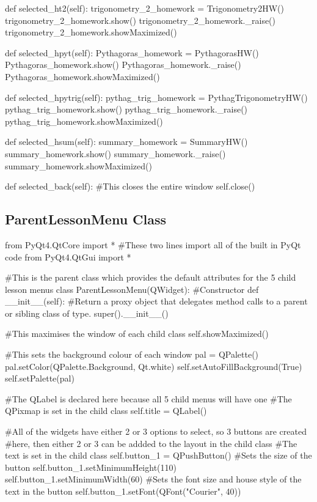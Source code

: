 \begin{landscape}
\begin{python}
    def selected_ht2(self):
        trigonometry_2_homework = Trigonometry2HW()
        trigonometry_2_homework.show()
        trigonometry_2_homework._raise()
        trigonometry_2_homework.showMaximized()

    def selected_hpyt(self):
        Pythagoras_homework = PythagorasHW()
        Pythagoras_homework.show()
        Pythagoras_homework._raise()
        Pythagoras_homework.showMaximized()

    def selected_hpytrig(self):
        pythag_trig_homework = PythagTrigonometryHW()
        pythag_trig_homework.show()
        pythag_trig_homework._raise()
        pythag_trig_homework.showMaximized()

    def selected_hsum(self):
        summary_homework = SummaryHW()
        summary_homework.show()
        summary_homework._raise()
        summary_homework.showMaximized()

    def selected_back(self):
        #This closes the entire window
        self.close()
\end{python}

\subsection{ParentLessonMenu Class}

\begin{python}
from PyQt4.QtCore import * #These two lines import all of the built in PyQt code
from PyQt4.QtGui import *

#This is the parent class which provides the default attributes for the 5 child lesson menus
class ParentLessonMenu(QWidget):
    #Constructor
    def __init__(self):
        #Return a proxy object that delegates method calls to a parent or sibling class of type.
        super().__init__()

        #This maximises the window of each child class
        self.showMaximized()

        #This sets the background colour of each window 
        pal = QPalette()
        pal.setColor(QPalette.Background, Qt.white)
        self.setAutoFillBackground(True)
        self.setPalette(pal)

        #The QLabel is declared here because all 5 child menus will have one
        #The QPixmap is set in the child class
        self.title = QLabel()

        #All of the widgets have either 2 or 3 options to select, so 3 buttons are created
        #here, then either 2 or 3 can be addded to the layout in the child class
        #The text is set in the child class
        self.button_1 = QPushButton()
        #Sets the size of the button
        self.button_1.setMinimumHeight(110)
        self.button_1.setMinimumWidth(60)
        #Sets the font size and house style of the text in the button
        self.button_1.setFont(QFont("Courier", 40))
        

\end{python}
\end{landscape}
